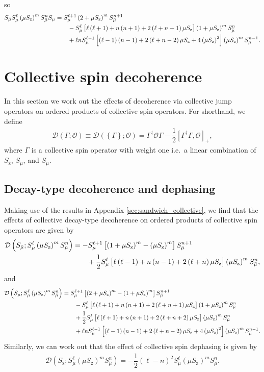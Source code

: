 \documentclass[aps,notitlepage,nofootinbib,11pt]{revtex4-1}
\newcommand{\f}[2]{\dfrac{#1}{#2}} %
\newcommand{\p}[1]{\left(#1\right)} %
\renewcommand{\sp}[1]{\left[#1\right]} %
\renewcommand{\set}[1]{\left\{#1\right\}} %
\newcommand{\D}{\mathcal{D}}
\renewcommand{\O}{\mathcal{O}}
\newcommand{\z}{\text{z}}
\newcommand{\bmu}{{\bar\mu}}
\newcommand{\1}{\mathds{1}}
\begin{document}
so
\begin{align}
  S_\bmu S_\mu^\ell \p{\mu S_\z}^m S_\bmu^n S_\mu
  &= S_\mu^{\ell+1} \p{2+\mu S_\z}^m S_\bmu^{n+1} \notag \\
  &\qquad - S_\mu^\ell
  \sp{\ell\p{\ell+1} + n\p{n+1}+2\p{\ell+n+1}\mu S_\z}
  \p{1+\mu S_\z}^m S_\bmu^n \notag \\
  &\qquad + \ell n S_\mu^{\ell-1}
  \sp{\p{\ell-1}\p{n-1}+2\p{\ell+n-2}\mu S_\z + 4\p{\mu S_\z}^2}
  \p{\mu S_\z}^m S_\bmu^{n-1}.
\end{align}


\section{Collective spin decoherence}
\label{sec:decoherence_collective}

In this section we work out the effects of decoherence via collective
jump operators on ordered products of collective spin operators.  For
shorthand, we define
\begin{align}
  \D\p{\Gamma;\O}
  \equiv \D\p{\set{\Gamma};\O}
  = \Gamma^\dag \O \Gamma - \f12\sp{\Gamma^\dag \Gamma, \O}_+,
\end{align}
where $\Gamma$ is a collective spin operator with weight one i.e.~a
linear combination of $S_\z$, $S_\mu$, and $S_\bmu$.

\subsection{Decay-type decoherence and dephasing}
\label{sec:decay_dephasing_collective}

Making use of the results in Appendix \ref{sec:sandwich_collective},
we find that the effects of collective decay-type decoherence on
ordered products of collective spin operators are given by
\begin{align}
  \D\p{S_\bmu; S_\mu^\ell \p{\mu S_\z}^m S_\bmu^n}
  &= -S_\mu^{\ell+1} \sp{\p{1+\mu S_\z}^m - \p{\mu S_\z}^m}
  S_\bmu^{n+1} \notag \\
  &\qquad + \f12 S_\mu^\ell \sp{\ell\p{\ell-1} + n\p{n-1}
    + 2\p{\ell+n}\mu S_\z} \p{\mu S_\z}^m S_\bmu^n,
\end{align}
and
\begin{align}
  \D\p{S_\mu; S_\mu^\ell \p{\mu S_\z}^m S_\bmu^n}
  &= S_\mu^{\ell+1} \sp{\p{2+\mu S_\z}^m-\p{1+\mu S_\z}^m}
  S_\bmu^{n+1} \notag \\
  &\qquad - S_\mu^\ell
  \sp{\ell\p{\ell+1} + n\p{n+1}+2\p{\ell+n+1}\mu S_\z}
  \p{1+\mu S_\z}^m S_\bmu^n \notag \\
  &\qquad + \f12 S_\mu^\ell
  \sp{\ell\p{\ell+1} + n\p{n+1}+2\p{\ell+n+2}\mu S_\z}
  \p{\mu S_\z}^m S_\bmu^n \notag \\
  &\qquad + \ell n S_\mu^{\ell-1}
  \sp{\p{\ell-1}\p{n-1}+2\p{\ell+n-2}\mu S_\z + 4\p{\mu S_\z}^2}
  \p{\mu S_\z}^m S_\bmu^{n-1}.
\end{align}
Similarly, we can work out that the effect of collective spin
dephasing is given by
\begin{align}
  \D\p{S_\z; S_\mu^\ell \p{\mu S_\z}^m S_\bmu^n}
  = -\f12 \p{\ell-n}^2 S_\mu^\ell \p{\mu S_\z}^m S_\bmu^n.
\end{align}
\end{document}
